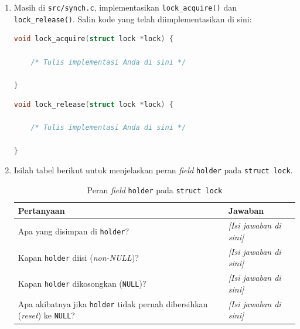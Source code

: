 \begin{enumerate}

	\item Masih di \texttt{src/synch.c}, implementasikan \texttt{lock\_acquire()} dan \texttt{lock\_release()}. Salin kode yang telah diimplementasikan di sini:

	      \begin{lstlisting}[language=C, caption={Implementasi \texttt{lock\_acquire()} oleh mahasiswa}]
void lock_acquire(struct lock *lock) {

    /* Tulis implementasi Anda di sini */

}
    \end{lstlisting}

	      \begin{lstlisting}[language=C, caption={Implementasi \texttt{lock\_release()} oleh mahasiswa}]
void lock_release(struct lock *lock) {

    /* Tulis implementasi Anda di sini */

}
    \end{lstlisting}

	\item Isilah tabel berikut untuk menjelaskan peran \textit{field} \texttt{holder} pada \texttt{struct lock}.

	      \begin{table}[htbp]
		      \centering
		      \caption{Peran \textit{field} \texttt{holder} pada \texttt{struct lock}}
		      \begin{tabulary}{\textwidth}{|L|L|}
			      \hline
			      \textbf{Pertanyaan} & \textbf{Jawaban} \\ \hline
			      Apa yang disimpan di \texttt{holder}?
			      & \textit{[Isi jawaban di sini]} \\ \hline
			      Kapan \texttt{holder} diisi (\textit{non-NULL})?
			      & \textit{[Isi jawaban di sini]} \\ \hline
			      Kapan \texttt{holder} dikosongkan (\texttt{NULL})?
			      & \textit{[Isi jawaban di sini]} \\ \hline
			      Apa akibatnya jika \texttt{holder} tidak pernah dibersihkan (\textit{reset}) ke \texttt{NULL}?
			      & \textit{[Isi jawaban di sini]} \\ \hline
		      \end{tabulary}
	      \end{table}

\end{enumerate}

